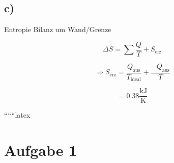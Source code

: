 

\subsection*{c)}
Entropie Bilanz um Wand/Grenze

\[
\Delta S = \sum \frac{Q}{T} + S_{\text{erz}}
\]

\[
\Rightarrow S_{\text{erz}} = \frac{Q_{\text{aus}}}{T_{\text{ideal}}} + \frac{-Q_{\text{aus}}}{T}
\]

\[
= 0.38 \frac{\text{kJ}}{\text{K}}
\]

``````latex


\section*{Aufgabe 1}